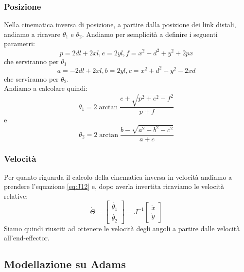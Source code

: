 \subsubsection{Posizione}
Nella cinematica inversa di posizione, a partire dalla posizione dei link distali, andiamo a ricavare $\theta_1$ e $\theta_2$. Andiamo per semplicità a definire i seguenti parametri:
\begin{equation*}
    p = 2dl + 2xl, e = 2yl, f = x^2+d^2+y^2+2px
\end{equation*}
che serviranno per $\theta_1$
\begin{equation*}
 a = -2dl+2xl, b = 2yl, c = x^2+d^2+y^2-2xd
\end{equation*}
che serviranno per $\theta_2$. 
\\Andiamo a calcolare quindi: 
\begin{equation}
    \theta_1 = 2\arctan\frac{e+\sqrt{p^2+e^2-f^2}}{p+f}
\end{equation}
e
\begin{equation}
    \theta_2 = 2\arctan\frac{b-\sqrt{a^2+b^2-c^2}}{a+c}
\end{equation}
\subsubsection{Velocità}
Per quanto riguarda il calcolo della cinematica inversa in velocità andiamo a prendere l'equazione \ref{eq:J12} e, dopo averla invertita ricaviamo le velocità relative:
\begin{equation}
    \dot{\Theta} = \begin{bmatrix} \dot{\theta_1} \\ \dot{\theta_2}
    \end{bmatrix} = J^{-1} \begin{bmatrix} \dot{x} \\ \dot{y} \end{bmatrix}
\end{equation}
Siamo quindi riusciti ad ottenere le velocità degli angoli a partire dalle velocità all'end-effector.
\subsection{Modellazione su Adams}